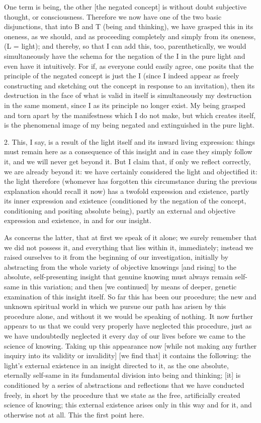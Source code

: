 One term is being, the other [the negated concept] is
without doubt subjective thought, or consciousness.
Therefore we now have one of the two basic disjunctions,
that into B and T (being and thinking),
we have grasped this in its oneness, as we should,
and as proceeding completely and simply
from its oneness, (L = light);
and thereby, so that I can add this, too, parenthetically,
we would simultaneously have the schema for the negation
of the I in the pure light and even have it intuitively.
For if, as everyone could easily agree, one posits
that the principle of the negated concept is just the I
(since I indeed appear as freely constructing and sketching out
the concept in response to an invitation),
then its destruction in the face of what is valid in itself is
simultaneously my destruction in the same moment,
since I as its principle no longer exist.
My being grasped and torn apart by the manifestness
which I do not make, but which creates itself, is
the phenomenal image of my being negated and extinguished
in the pure light.

2.  This, I say, is a result of the light itself
and its inward living expression:
things must remain here as a consequence of
this insight and in case they simply follow it,
and we will never get beyond it.
But I claim that, if only we reflect correctly,
we are already beyond it:
we have certainly considered the light
and objectified it: the light therefore
(whomever has forgotten this circumstance
during the previous explanation should recall it now)
has a twofold expression and existence,
partly its inner expression and existence
(conditioned by the negation of the concept,
conditioning and positing absolute being),
partly an external and objective expression and existence,
in and for our insight.

As concerns the latter, that at first we speak of it alone;
we surely remember that we did not possess it,
and everything that lies within it, immediately;
instead we raised ourselves to it from
the beginning of our investigation,
initially by abstracting from the whole variety
of objective knowings [and rising] to
the absolute, self-presenting insight
that genuine knowing must always remain self-same in this variation;
and then [we continued] by means of
deeper, genetic examination of this insight itself.
So far this has been our procedure;
the new and unknown spiritual world
in which we pursue our path has arisen
by this procedure alone,
and without it we would be speaking of nothing.
It now further appears to us that
we could very properly have neglected this procedure,
just as we have undoubtedly neglected it every day
of our lives before we came to the science of knowing.
Taking up this appearance now
[while not making any further inquiry
into its validity or invalidity]
[we find that] it contains the following:
the light’s external existence in an insight directed to it,
as the one absolute, eternally self-same
in its fundamental division into being and thinking;
[it] is conditioned by a series of abstractions and reflections
that we have conducted freely,
in short by the procedure that we state as
the free, artificially created science of knowing;
this external existence arises only in this way and for it,
and otherwise not at all.
This the first point here.


